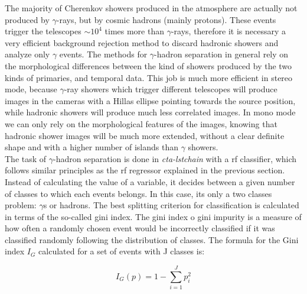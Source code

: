 \documentclass[main.tex]{subfiles}
\begin{document}
The majority of Cherenkov showers produced in the atmosphere are actually not produced by $\gamma$-rays, but by cosmic hadrons (mainly protons). These events trigger the telescopes $\sim 10^4$ times more than $\gamma$-rays, therefore it is necessary a very efficient background rejection method to discard hadronic showers and analyze only $\gamma$ events. The methods for $\gamma$-hadron separation in general rely on the morphological differences between the kind of showers produced by the two kinds of primaries, and temporal data. This job is much more efficient in stereo mode, because $\gamma$-ray showers which trigger different telescopes will produce images in the cameras with a Hillas ellipse pointing towards the source position, while hadronic showers will produce much less correlated images. In mono mode we can only rely on the morphological features of the images, knowing that hadronic shower images will be much more extended, without a clear definite shape and with a higher number of islands than $\gamma$ showers.\\
The task of $\gamma$-hadron separation is done in \textit{cta-lstchain} with a \gls{rf} classifier, which follows similar principles as the \gls{rf} regressor explained in the previous section. Instead of calculating the value of a variable, it decides between a given number of classes to which each events belongs. In this case, its only a two classes problem: $\gamma$s or hadrons.
The best splitting criterion for classification is calculated in terms of the so-called gini index. The gini index o gini impurity is a measure of how often a randomly chosen event would be incorrectly classified if it was classified randomly following the distribution of classes. The formula for the Gini index $I_G$ calculated for a set of events with J classes is:

\begin{equation}
  I_G(p) = 1 - \sum_{i=1}^J p_i^2
\end{equation}
\end{document}

